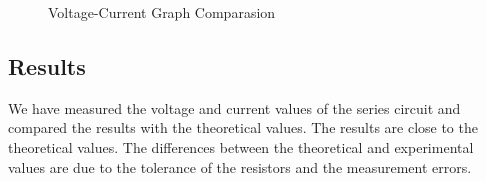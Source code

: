 \begin{enumerate}
\begin{figure}[h]
        \caption{Voltage-Current Graph Comparasion}
    \end{figure}
\end{enumerate}

\subsection{Results}
We have measured the voltage and current values of the series circuit and compared the results with the theoretical values. The results are close to the theoretical values. The differences between the theoretical and experimental values are due to the tolerance of the resistors and the measurement errors.

\newpage
\thispagestyle{plain}
